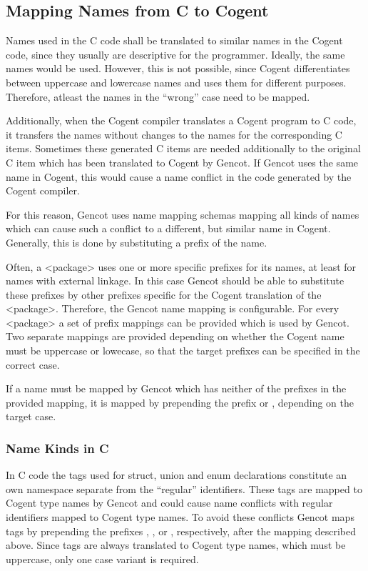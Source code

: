 \subsection{Mapping Names from C to Cogent}
\label{design-names}

Names used in the C code shall be translated to similar names in the Cogent code, since they usually are descriptive for the
programmer. Ideally, the same names would be used. However, this is not possible, since Cogent differentiates between 
uppercase and lowercase names and uses them for different purposes. Therefore, atleast the names in the ``wrong'' case
need to be mapped.

Additionally, when the Cogent compiler translates a Cogent program to C code, it transfers the names without changes to
the names for the corresponding C items. Sometimes these generated C items are needed additionally to
the original C item which has been translated to Cogent by Gencot. If Gencot uses the same name in Cogent, this would cause
a name conflict in the code generated by the Cogent compiler.

For this reason, Gencot uses name mapping schemas mapping all kinds of names which can cause such a conflict to a different, but 
similar name in Cogent. Generally, this is done by substituting a prefix of the name.

Often, a <package> uses one or more specific prefixes for its names, at least for names with external linkage. In this case
Gencot should be able to substitute these prefixes by other prefixes specific for the Cogent translation of the <package>.
Therefore, the Gencot name mapping is configurable. For every <package> a set of prefix mappings can be provided which is
used by Gencot. Two separate mappings are provided depending on whether the Cogent name must be uppercase or lowecase, so 
that the target prefixes can be specified in the correct case.

If a name must be mapped by Gencot which has neither of the prefixes in the provided mapping, it is mapped 
by prepending the prefix  or , depending on the target case.

\subsubsection{Name Kinds in C}

In C code the tags used for struct, union and enum declarations constitute an own namespace separate from the ``regular''
identifiers. These tags are mapped to Cogent type names by Gencot and could cause name conflicts with regular identifiers
mapped to Cogent type names. To avoid these conflicts Gencot maps tags by prepending the prefixes , 
, or , respectively, after the mapping described above. Since tags are always translated to Cogent 
type names, which must be uppercase, only one case variant is required.


